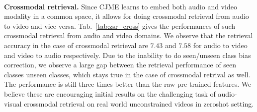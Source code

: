 \begin{table}
\centering
{}
\caption{Zeroshot crossmodal retrieval performances (\% mAP).}
\label{tab:zsr_cross}
\vspace{-1em}
\end{table}
\vspace{0.5em} \\
\textbf{Crossmodal retrieval.}
Since CJME learns to embed both audio and video modality in a common space, it allows for doing crossmodal retrieval from audio to video and vice-versa. Tab.~\ref{tab:zsr_cross} gives the performances of such crossmodal retrieval from audio and video domains. We observe that the retrieval accuracy in the case of crossmodal retrieval are $7.43$ and $7.58$ for audio to video and video to audio respectively. Due to the inability to do seen/unseen class bias correction, we observe a large gap between the retrieval performance of seen classes \cf unseen classes, which stays true in the case of crossmodal retrival as well. The performance is still three times better than the raw pre-trained features. We believe these are encouraging initial results on the challenging task of audio-visual crossmodal retrieval on real world unconstrained videos in zeroshot setting.
\begin{table}[t]
 \centering
{}
 \caption{Ablation study to verify the contribution of different loss terms. Performances for proposed CJME (with attention) method on zeroshot classification (\% mAcc)}
 \label{tab:ablation}
 \vspace{-1em}
 \end{table}
